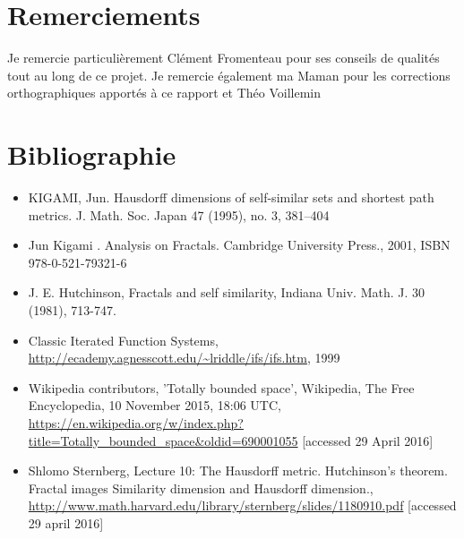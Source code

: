 \documentclass[a4paper, 12pt]{report}
\begin{document}
	\chapter*{Remerciements}
	
	Je remercie particulièrement Clément Fromenteau pour ses conseils de qualités tout au long de ce projet.
	\newline
	Je remercie également ma Maman pour les corrections orthographiques apportés à ce rapport et Théo Voillemin 
	
	\chapter*{Bibliographie}
		\begin{itemize}
			\setlength\itemsep{.5 cm}
			\item KIGAMI, Jun. Hausdorff dimensions of self-similar sets and shortest path metrics. J. Math. Soc. Japan 47 (1995), no. 3, 381--404
			
			\item Jun Kigami . Analysis on Fractals. Cambridge University Press., 2001, ISBN 978-0-521-79321-6
			
			\item J. E. Hutchinson, Fractals and self similarity, Indiana Univ. Math. J. 30 (1981), 713-747.

			\item Classic Iterated Function Systems, \url{http://ecademy.agnesscott.edu/~lriddle/ifs/ifs.htm}, 1999

			\item Wikipedia contributors, 'Totally bounded space', Wikipedia, The Free Encyclopedia, 10 November 2015, 18:06 UTC, \url{https://en.wikipedia.org/w/index.php?title=Totally_bounded_space&oldid=690001055} [accessed 29 April 2016]
			
			\item Shlomo Sternberg, Lecture 10: The Hausdorff metric. Hutchinson's theorem. Fractal images Similarity dimension and Hausdorff dimension., \url{http://www.math.harvard.edu/library/sternberg/slides/1180910.pdf} [accessed 29 april 2016]
		\end{itemize}
\end{document}
